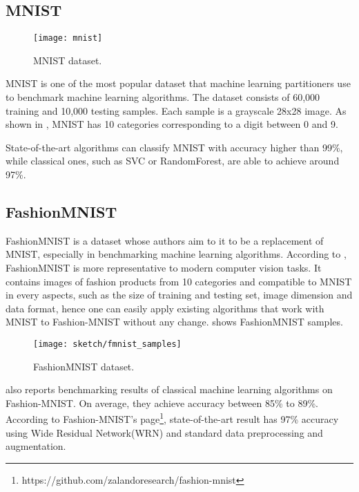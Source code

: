 \subsection{MNIST}

\begin{figure}[!hbt]
	\centering
	\texttt{[image: mnist]}
	\caption{MNIST dataset.}
	\label{fig:mnist_samples}
\end{figure}

MNIST is one of the most popular dataset that machine learning partitioners use to benchmark machine learning algorithms. The dataset consists of 60,000 training and 10,000 testing samples. Each sample is a grayscale 28x28 image. As shown in \addfigure{\ref{fig:mnist_samples}}, MNIST has 10 categories corresponding to a digit between 0 and 9.


State-of-the-art algorithms can classify MNIST with accuracy higher than 99\%, while classical ones, such as SVC or RandomForest, are able to achieve around 97\%\cite{XiaoFashionMNISTNovelImage2017}.


\subsection{FashionMNIST}

FashionMNIST is a dataset whose authors aim to it to be a replacement of MNIST, especially in  benchmarking machine learning algorithms.  According to \cite{XiaoFashionMNISTNovelImage2017},  FashionMNIST is more representative to modern computer vision tasks. It contains images of fashion products from 10 categories and compatible  to MNIST in every aspects, such as the size of training and testing set, image dimension and data format, hence one can easily  apply existing algorithms that work with MNIST to Fashion-MNIST without any change. \addfigure{\ref{fig:fashion_mnist_samples}} shows FashionMNIST samples.

\begin{figure}[!hbt]
\centering
\texttt{[image: sketch/fmnist\_samples]}
\caption{FashionMNIST dataset.}
\label{fig:fashion_mnist_samples}
\end{figure}

\cite{XiaoFashionMNISTNovelImage2017} also reports benchmarking results of classical machine learning algorithms on Fashion-MNIST. On average, they achieve accuracy between 85\% to 89\%. According to Fashion-MNIST's page\footnote{https://github.com/zalandoresearch/fashion-mnist}, state-of-the-art result has 97\% accuracy using Wide Residual Network(WRN)\cite{ZagoruykoWideResidualNetworks2016} and standard data preprocessing and augmentation.


